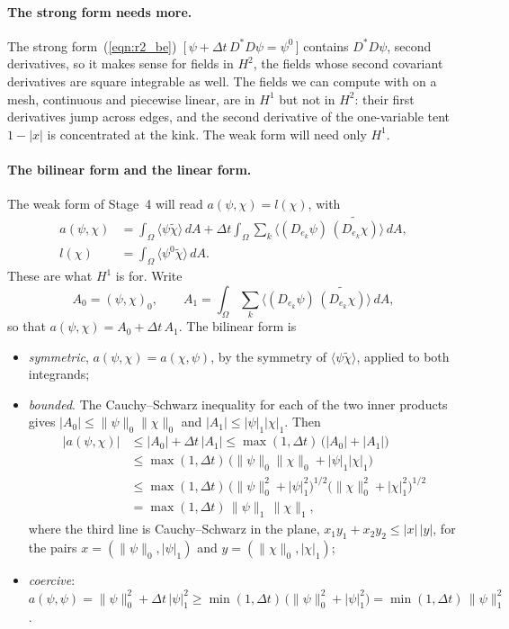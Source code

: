 \paragraph{The strong form needs more.} The strong form~(\ref{eqn:r2_be})~[\,$\psi + \Delta t\,D^*D\psi = \psi^0$\,] contains $D^*D\psi$, second derivatives, so it makes sense for fields in $H^2$, the fields whose second covariant derivatives are square integrable as well. The fields we can compute with on a mesh, continuous and piecewise linear, are in $H^1$ but not in $H^2$: their first derivatives jump across edges, and the second derivative of the one-variable tent $1 - |x|$ is concentrated at the kink. The weak form will need only $H^1$.

\paragraph{The bilinear form and the linear form.} The weak form of Stage~4 will read $a(\psi, \chi) = l(\chi)$, with
\begin{equation}
\label{eqn:r2_forms}
\begin{aligned}
a(\psi, \chi) &= \int_\Omega \langle\psi\widetilde\chi\rangle\, dA + \Delta t\int_\Omega \sum_k \big\langle (D_{e_k}\psi)\,\widetilde{(D_{e_k}\chi)}\big\rangle\, dA, \\
l(\chi) &= \int_\Omega \langle\psi^0\widetilde\chi\rangle\, dA .
\end{aligned}
\end{equation}
These are what $H^1$ is for. Write
\begin{equation*}
A_0 = (\psi, \chi)_0, \qquad A_1 = \int_\Omega\sum_k\big\langle (D_{e_k}\psi)\,\widetilde{(D_{e_k}\chi)}\big\rangle\, dA ,
\end{equation*}
so that $a(\psi, \chi) = A_0 + \Delta t\, A_1$. The bilinear form is
\begin{itemize}
\item \emph{symmetric}, $a(\psi, \chi) = a(\chi, \psi)$, by the symmetry of $\langle\psi\widetilde\chi\rangle$, applied to both integrands;
\item \emph{bounded}. The Cauchy--Schwarz inequality for each of the two inner products gives $|A_0| \le \|\psi\|_0\|\chi\|_0$ and $|A_1| \le |\psi|_1|\chi|_1$. Then
\begin{align*}
|a(\psi, \chi)| &\le |A_0| + \Delta t\,|A_1| \le \max(1, \Delta t)\,\big(|A_0| + |A_1|\big) \\
&\le \max(1, \Delta t)\,\big(\|\psi\|_0\|\chi\|_0 + |\psi|_1|\chi|_1\big) \\
&\le \max(1, \Delta t)\,\big(\|\psi\|_0^2 + |\psi|_1^2\big)^{1/2}\big(\|\chi\|_0^2 + |\chi|_1^2\big)^{1/2} \\
&= \max(1, \Delta t)\,\|\psi\|_1\,\|\chi\|_1 ,
\end{align*}
where the third line is Cauchy--Schwarz in the plane, $x_1y_1 + x_2y_2 \le |x|\,|y|$, for the pairs $x = (\|\psi\|_0, |\psi|_1)$ and $y = (\|\chi\|_0, |\chi|_1)$;
\item \emph{coercive}: $a(\psi, \psi) = \|\psi\|_0^2 + \Delta t\,|\psi|_1^2 \ge \min(1, \Delta t)\,\big(\|\psi\|_0^2 + |\psi|_1^2\big) = \min(1, \Delta t)\, \|\psi\|_1^2$.
\end{itemize}
